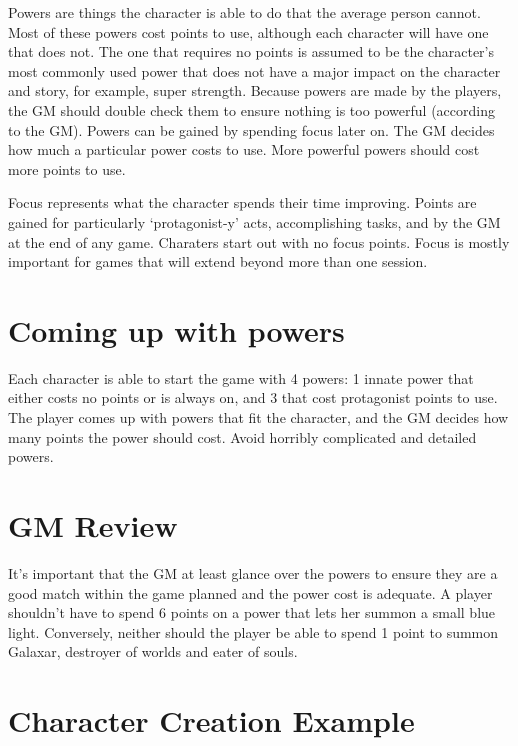 \begin{flushleft}
Powers are things the character is able to do that the average person cannot.
Most of these powers cost points to use, although each character will have
one that does not. The one that requires no points is assumed to be the
character's most commonly used power that does not have a major impact on the
character and story, for example, super strength. Because powers are made by
the players, the GM should double check them to ensure nothing is too powerful
(according to the GM). Powers can be gained by spending focus later on. The GM
decides how much a particular power costs to use. More powerful powers should
cost more points to use.

Focus represents what the character spends their time improving. Points are
gained for particularly `protagonist-y' acts, accomplishing tasks, and by
the GM at the end of any game. Charaters start out with no focus points. Focus
is mostly important for games that will extend beyond more than one session.

\section*{Coming up with powers}

Each character is able to start the game with 4 powers: 1 innate power that
either costs no points or is always on, and 3 that cost protagonist points to
use. The player comes up with powers that fit the character, and the GM
decides how many points the power should cost. Avoid horribly complicated and
detailed powers.

\section*{GM Review}
It's important that the GM at least glance over the powers to ensure they are
a good match within the game planned and the power cost is adequate. A player
shouldn't have to spend 6 points on a power that lets her summon a small blue
light. Conversely, neither should the player be able to spend 1 point to
summon Galaxar, destroyer of worlds and eater of souls.

\section*{Character Creation Example}


\end{flushleft}
